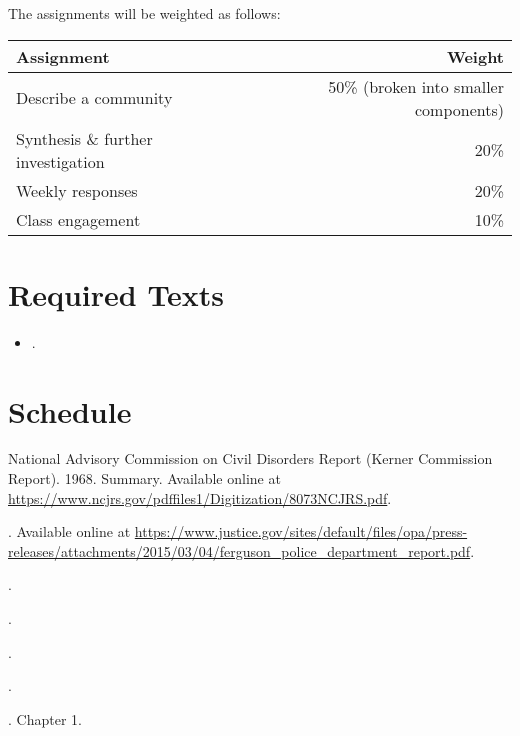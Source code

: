 \documentclass[11pt]{syllabus}
\begin{document}
\noindent The assignments will be weighted as follows:

\begin{center}
\begin{tabular}{lr}
\textbf{Assignment} & \textbf{Weight}\\\toprule
Describe a community & 50\% (broken into smaller components) \\
Synthesis \& further investigation & 20\%\\
Weekly responses & 20\%\\
Class engagement & 10\%\\\bottomrule
\end{tabular}
\end{center}

\showgrades


\section{Required Texts}
\begin{itemize}
    \item {}.
\end{itemize}

\section{Schedule}

\begin{readings}
\item National Advisory Commission on Civil Disorders Report (Kerner Commission Report). 1968. Summary. Available online at \url{https://www.ncjrs.gov/pdffiles1/Digitization/8073NCJRS.pdf}.
\item {}. Available online at \url{https://www.justice.gov/sites/default/files/opa/press-releases/attachments/2015/03/04/ferguson_police_department_report.pdf}.
\item {}.
\end{readings}

\begin{readings}
\item {}.
\item {}.
\item {}.
\item {}. Chapter 1.
\end{readings}
\end{document}
